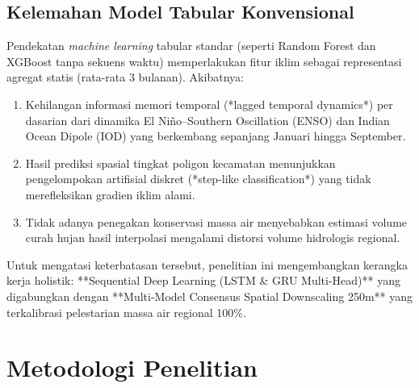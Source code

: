 \documentclass[11pt,a4paper]{article}
\begin{document}
\subsection{Kelemahan Model Tabular Konvensional}
Pendekatan \textit{machine learning} tabular standar (seperti Random Forest dan XGBoost tanpa sekuens waktu) memperlakukan fitur iklim sebagai representasi agregat statis (rata-rata 3 bulanan). Akibatnya:
\begin{enumerate}
    \item Kehilangan informasi memori temporal (*lagged temporal dynamics*) per dasarian dari dinamika El Ni\~no--Southern Oscillation (ENSO) dan Indian Ocean Dipole (IOD) yang berkembang sepanjang Januari hingga September.
    \item Hasil prediksi spasial tingkat poligon kecamatan menunjukkan pengelompokan artifisial diskret (*step-like classification*) yang tidak merefleksikan gradien iklim alami.
    \item Tidak adanya penegakan konservasi massa air menyebabkan estimasi volume curah hujan hasil interpolasi mengalami distorsi volume hidrologis regional.
\end{enumerate}

Untuk mengatasi keterbatasan tersebut, penelitian ini mengembangkan kerangka kerja holistik: **Sequential Deep Learning (LSTM \& GRU Multi-Head)** yang digabungkan dengan **Multi-Model Consensus Spatial Downscaling 250m** yang terkalibrasi pelestarian massa air regional 100\%.

\section{Metodologi Penelitian}
\end{document}
